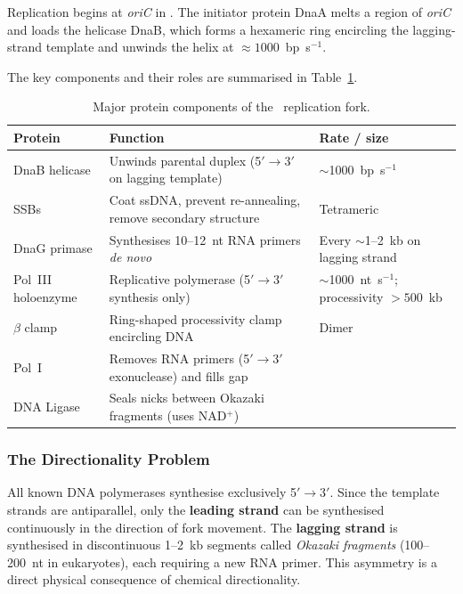 \documentclass[12pt, a4paper, oneside]{report}
\begin{document}
Replication begins at \textit{oriC} in \Ecoli. The initiator protein DnaA
melts a region of \textit{oriC} and loads the helicase DnaB, which forms
a hexameric ring encircling the lagging-strand template and unwinds the
helix at $\approx 1000$~bp~s$^{-1}$.

The key components and their roles are summarised in
Table~\ref{tab:repfork}.

\begin{table}[H]
  \centering
  \caption{Major protein components of the \Ecoli\ replication fork.}
  \label{tab:repfork}
  \small
  \begin{tabularx}{\textwidth}{lXl}
    \toprule
    \textbf{Protein} & \textbf{Function} & \textbf{Rate / size} \\
    \midrule
    DnaB helicase  & Unwinds parental duplex (5$'\to$3$'$ on lagging template)
                   & $\sim$1000~bp~s$^{-1}$ \\
    SSBs           & Coat ssDNA, prevent re-annealing, remove secondary structure
                   & Tetrameric \\
    DnaG primase   & Synthesises 10--12~nt RNA primers \textit{de novo}
                   & Every $\sim$1--2~kb on lagging strand \\
    Pol~III holoenzyme & Replicative polymerase (5$'\to$3$'$ synthesis only)
                   & $\sim$1000~nt~s$^{-1}$; processivity $>500$~kb \\
    $\beta$ clamp  & Ring-shaped processivity clamp encircling DNA
                   & Dimer \\
    Pol~I          & Removes RNA primers (5$'\to$3$'$ exonuclease) and fills gap
                   & \\
    DNA Ligase     & Seals nicks between Okazaki fragments (uses NAD$^+$)
                   & \\
    \bottomrule
  \end{tabularx}
\end{table}

\subsubsection{The Directionality Problem}

All known DNA polymerases synthesise exclusively 5$'\to$3$'$. Since the
template strands are antiparallel, only the \textbf{leading strand} can
be synthesised continuously in the direction of fork movement. The
\textbf{lagging strand} is synthesised in discontinuous 1--2~kb segments
called \emph{Okazaki fragments} (100--200~nt in eukaryotes), each
requiring a new RNA primer. This asymmetry is a direct physical
consequence of chemical directionality.
\end{document}
